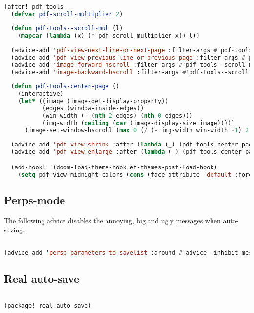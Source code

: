 \documentclass[11pt]{article}
\begin{document}
\begin{lstlisting}[language=Lisp]%! Someone please complete this list for me

(after! pdf-tools
  (defvar pdf-scroll-multiplier 2)
  
  (defun pdf-tools--scroll-mul (l)
    (mapcar (lambda (x) (* pdf-scroll-multiplier x)) l))
  
  (advice-add 'pdf-view-next-line-or-next-page :filter-args #'pdf-tools--scroll-mul)
  (advice-add 'pdf-view-previous-line-or-previous-page :filter-args #'pdf-tools--scroll-mul)
  (advice-add 'image-forward-hscroll :filter-args #'pdf-tools--scroll-mul)
  (advice-add 'image-backward-hscroll :filter-args #'pdf-tools--scroll-mul)
  
  (defun pdf-tools-center-page ()
    (interactive)
    (let* ((image (image-get-display-property))
           (edges (window-inside-edges))
           (win-width (- (nth 2 edges) (nth 0 edges)))
           (img-width (ceiling (car (image-display-size image)))))
      (image-set-window-hscroll (max 0 (/ (- img-width win-width -1) 2)))))
  
  (advice-add 'pdf-view-shrink :after (lambda (_) (pdf-tools-center-page)))
  (advice-add 'pdf-view-enlarge :after (lambda (_) (pdf-tools-center-page)))

  (add-hook! '(doom-load-theme-hook ef-themes-post-load-hook)
    (setq pdf-view-midnight-colors (cons (face-attribute 'default :foreground) (face-attribute 'default :background)))))
\end{lstlisting}

\subsection{Perps-mode}
\label{sec:perps-mode}
The following advice disables the annoying, big and ugly messages when auto-saving.

\begin{lstlisting}[language=Lisp]%! Someone please complete this list for me

(advice-add 'persp-parameters-to-savelist :around #'advice--inhibit-message)
\end{lstlisting}

\subsection{Real auto-save}
\label{sec:real-auto-save}
\begin{lstlisting}[language=Lisp]%! Someone please complete this list for me

(package! real-auto-save)
\end{lstlisting}
\end{document}
